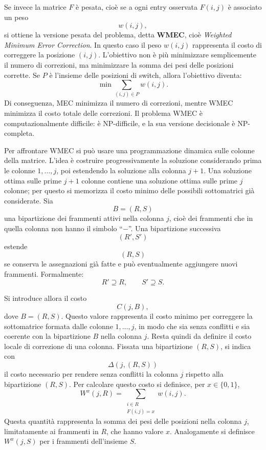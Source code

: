 Se invece la matrice \(F\) è pesata, cioè se a ogni entry osservata \(F(i,j)\) è associato un peso
\[
w(i,j),
\]
si ottiene la versione pesata del problema, detta \textbf{WMEC}, cioè \emph{Weighted Minimum Error Correction}. 
In questo caso il peso \(w(i,j)\) rappresenta il costo di correggere la posizione \((i,j)\). 
L'obiettivo non è più minimizzare semplicemente il numero di correzioni, ma minimizzare la somma dei pesi delle 
posizioni corrette. Se \(P\) è l'insieme delle posizioni di switch, allora l'obiettivo diventa:
\[
\min \sum_{(i,j)\in P} w(i,j).
\]
Di conseguenza, MEC minimizza il numero di correzioni, mentre WMEC minimizza il costo totale delle correzioni. 
Il problema WMEC è computazionalmente difficile: è NP-difficile, e la sua versione decisionale è NP-completa.

Per affrontare WMEC si può usare una programmazione dinamica sulle colonne della matrice. 
L'idea è costruire progressivamente la soluzione considerando prima le colonne \(1,\dots,j\), 
poi estendendo la soluzione alla colonna \(j+1\). Una soluzione ottima sulle prime \(j+1\) 
colonne contiene una soluzione ottima sulle prime \(j\) colonne; per questo si memorizza il costo minimo 
delle possibili sottomatrici già considerate.
Sia
\[
B=(R,S)
\]
una bipartizione dei frammenti attivi nella colonna \(j\), cioè dei frammenti che in quella colonna non hanno il 
simbolo ``\(-\)''. Una bipartizione successiva
\[
(R',S')
\]
estende
\[
(R,S)
\]
se conserva le assegnazioni già fatte e può eventualmente aggiungere nuovi frammenti. Formalmente:
\[
R' \supseteq R,
\qquad
S' \supseteq S.
\]

Si introduce allora il costo
\[
C(j,B),
\]
dove \(B=(R,S)\). Questo valore rappresenta il costo minimo per correggere la sottomatrice formata dalle colonne 
\(1,\dots,j\), in modo che sia senza conflitti e sia coerente con la bipartizione \(B\) nella colonna \(j\). 
Resta quindi da definire il costo locale di correzione di una colonna. 
Fissata una bipartizione \((R,S)\), si indica con
\[
\Delta(j,(R,S))
\]
il costo necessario per rendere senza conflitti la colonna \(j\) rispetto alla bipartizione \((R,S)\).
Per calcolare questo costo si definisce, per \(x\in\{0,1\}\),
\[
W^x(j,R)=
\sum_{\substack{i\in R\\F(i,j)=x}} w(i,j).
\]
Questa quantità rappresenta la somma dei pesi delle posizioni nella colonna \(j\), 
limitatamente ai frammenti in \(R\), che hanno valore \(x\). Analogamente si definisce \(W^x(j,S)\) 
per i frammenti dell'insieme \(S\).

